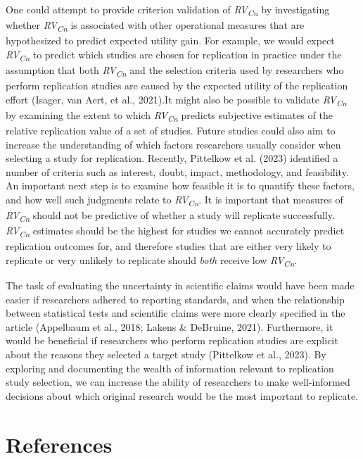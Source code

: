 \documentclass[
  man,floatsintext]{apa6}
\begin{document}
One could attempt to provide criterion validation of \emph{RV\textsubscript{Cn}} by investigating whether \emph{RV\textsubscript{Cn}} is associated with other operational measures that are hypothesized to predict expected utility gain. For example, we would expect \emph{RV\textsubscript{Cn}} to predict which studies are chosen for replication in practice under the assumption that both \emph{RV\textsubscript{Cn}} and the selection criteria used by researchers who perform replication studies are caused by the expected utility of the replication effort (Isager, van Aert, et al., 2021).It might also be possible to validate \emph{RV\textsubscript{Cn}} by examining the extent to which \emph{RV\textsubscript{Cn}} predicts subjective estimates of the relative replication value of a set of studies. Future studies could also aim to increase the understanding of which factors researchers usually consider when selecting a study for replication. Recently, Pittelkow et al. (2023) identified a number of criteria such as interest, doubt, impact, methodology, and feasibility. An important next step is to examine how feasible it is to quantify these factors, and how well such judgments relate to \emph{RV\textsubscript{Cn}}. It is important that measures of \emph{RV\textsubscript{Cn}} should not be predictive of whether a study will replicate successfully. \emph{RV\textsubscript{Cn}} estimates should be the highest for studies we cannot accurately predict replication outcomes for, and therefore studies that are either very likely to replicate or very unlikely to replicate should \emph{both} receive low \emph{RV\textsubscript{Cn}}.

The task of evaluating the uncertainty in scientific claims would have been made easier if researchers adhered to reporting standards, and when the relationship between statistical tests and scientific claims were more clearly specified in the article (Appelbaum et al., 2018; Lakens \& DeBruine, 2021). Furthermore, it would be beneficial if researchers who perform replication studies are explicit about the reasons they selected a target study (Pittelkow et al., 2023). By exploring and documenting the wealth of information relevant to replication study selection, we can increase the ability of researchers to make well-informed decisions about which original research would be the most important to replicate.

\hypertarget{references}{%
\section*{References}\label{references}}
\end{document}
